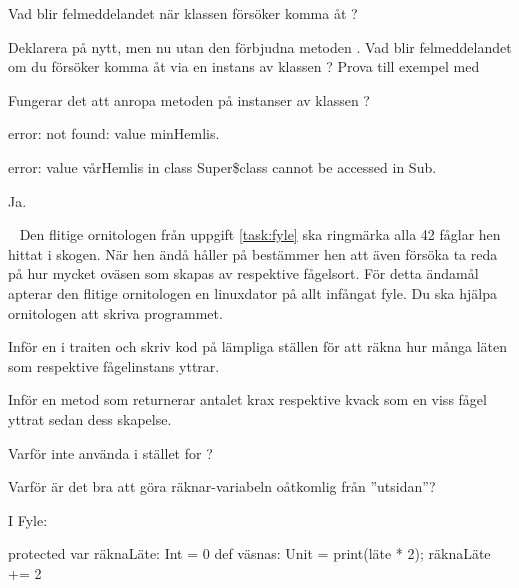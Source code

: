 \Subtask Vad blir felmeddelandet när klassen  försöker komma åt ?

\Subtask Deklarera  på nytt, men nu utan den förbjudna metoden . Vad blir felmeddelandet om du försöker komma åt  via en instans av klassen ? Prova till exempel med 

\Subtask Fungerar det att anropa metoden  på instanser av klassen ?

\SOLUTION


\TaskSolved \what


\SubtaskSolved  error: not found: value minHemlis.

\SubtaskSolved  error: value vårHemlis in class Super\$class cannot be accessed in Sub.

\SubtaskSolved  Ja.


\QUESTEND







\QUESTBEGIN

\Task  \what~  Den flitige ornitologen från uppgift \ref{task:fyle} ska ringmärka alla 42 fåglar hen hittat i skogen. När hen ändå håller på bestämmer hen att även försöka ta reda på hur mycket oväsen som skapas av respektive fågelsort. För detta ändamål apterar den flitige ornitologen en linuxdator på allt infångat fyle. Du ska hjälpa ornitologen att skriva programmet.

\Subtask Inför en  i traiten  och skriv kod på lämpliga ställen för att räkna hur många läten som respektive fågelinstans yttrar.

\Subtask Inför en metod  som returnerar antalet krax respektive kvack som en viss fågel yttrat sedan dess skapelse.

\Subtask Varför inte använda  i stället for ?

\Subtask Varför är det bra att göra räknar-variabeln oåtkomlig från ''utsidan''?



\SOLUTION


\TaskSolved \what


\SubtaskSolved  I Fyle:
\begin{Code}
protected var räknaLäte: Int = 0
def väsnas: Unit = { print(läte * 2); räknaLäte += 2 }
\end{Code}

